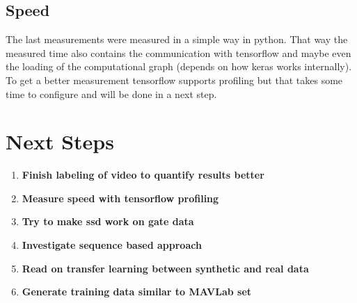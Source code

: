 \documentclass{article}
\begin{document}
\subsection{Speed}

The last measurements were measured in a simple way in python. That way the measured time also contains the communication with tensorflow and maybe even the loading of the computational graph (depends on how keras works internally). To get a better measurement tensorflow supports profiling but that takes some time to configure and will be done in a next step.

\section{Next Steps}
\begin{enumerate}
		\item \textbf{Finish labeling of video to quantify results better}
		\item \textbf{Measure speed with tensorflow profiling}
		\item \textbf{Try to make ssd work on gate data}
		\item \textbf{Investigate sequence based approach}
		\item \textbf{Read on transfer learning between synthetic and real data}
		\item \textbf{Generate training data similar to MAVLab set}
\end{enumerate}









\end{document}
